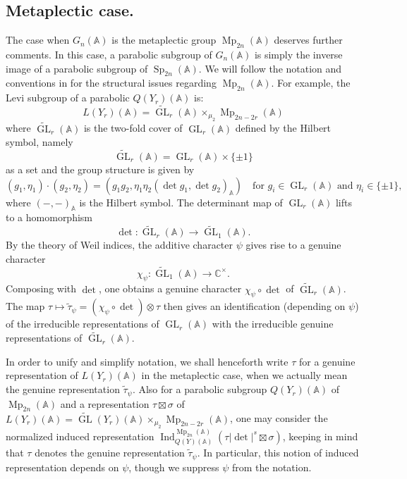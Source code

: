 \documentclass[10pt]{amsart}
\theoremstyle{plain}
\numberwithin{equation}{section}
\begin{document}
\vskip 5pt

  
\subsection{\bf Metaplectic case.} 
 The case when $G_n({\mathbb{A}})$ is the metaplectic group ${\operatorname{Mp}}_{2n}({\mathbb{A}})$ deserves
 further comments. In this case, a parabolic subgroup of $G_n({\mathbb{A}})$ is
 simply the inverse image of a parabolic subgroup of ${\operatorname{Sp}}_{2n}({\mathbb{A}})$. We
 will follow the notation and conventions in \cite{GS} for the  structural
 issues regarding ${\operatorname{Mp}}_{2n}({\mathbb{A}})$. For example, the Levi subgroup of a
 parabolic $Q(Y_r)({\mathbb{A}})$ is:
 \[  L(Y_r)({\mathbb{A}})  = \widetilde{\operatorname{GL}}_r({\mathbb{A}}) \times_{\mu_2} {\operatorname{Mp}}_{2n-2r}({\mathbb{A}}) \]
 where $\widetilde{\operatorname{GL}}_r({\mathbb{A}})$ is the two-fold cover of ${\operatorname{GL}}_r({\mathbb{A}})$
 defined by the Hilbert symbol, namely
 \[ \widetilde{\operatorname{GL}}_r({\mathbb{A}})={\operatorname{GL}}_r({\mathbb{A}})\times\{\pm 1\} \]
  as a set and the
   group structure is given by 
   \[ (g_1,\eta_1)\cdot (g_2, \eta_2)=(g_1g_2,
   \eta_1\eta_2(\det g_1, \det g_2)_{\mathbb{A}}) \quad \text{for $g_i\in{\operatorname{GL}}_r({\mathbb{A}})$ and
   $\eta_i\in\{\pm 1\}$,} \]
    where $(-,-)_{\mathbb{A}}$ is the Hilbert symbol. The
   determinant map of ${\operatorname{GL}}_r({\mathbb{A}})$ lifts to a homomorphism
 \[  \det:  \widetilde{\operatorname{GL}}_r({\mathbb{A}}) \longrightarrow \widetilde{\operatorname{GL}}_1({\mathbb{A}}). \] 
By the theory of Weil indices,  the additive character $\psi$ gives rise to a genuine character 
\[  \chi_{\psi} :  \widetilde{\operatorname{GL}}_1({\mathbb{A}}) \longrightarrow {\mathbb C}^{\times}. \]
 Composing with $\det$, one obtains a genuine character $\chi_{\psi}
 \circ \det$ of $\widetilde{\operatorname{GL}}_r({\mathbb{A}})$. The map $\tau \mapsto
 \tilde{\tau}_{\psi} = (\chi_{\psi} \circ \det) \otimes \tau$ then
 gives an identification (depending on $\psi$) of the irreducible
 representations of ${\operatorname{GL}}_r({\mathbb{A}})$ with the irreducible genuine
 representations of $\widetilde{\operatorname{GL}}_r({\mathbb{A}})$. 
 \vskip 5pt
 
 In order to unify and simplify notation, we shall henceforth write
 $\tau$ for a genuine representation of $L(Y_r)({\mathbb{A}})$ in the metaplectic
 case, when we actually mean the genuine representation
 $\tilde{\tau}_{\psi}$. 
Also for a parabolic subgroup $Q(Y_r)({\mathbb{A}})$ of ${\operatorname{Mp}}_{2n}({\mathbb{A}})$ and a
 representation $\tau \boxtimes \sigma$ of $L(Y_r)({\mathbb{A}})= \widetilde{\operatorname{GL}}(Y_r)({\mathbb{A}})
 \times_{\mu_2} {\operatorname{Mp}}_{2n-2r}({\mathbb{A}})$, one may consider the normalized induced
 representation ${\operatorname{Ind}}_{Q(Y)({\mathbb{A}})}^{{\operatorname{Mp}}_{2n}({\mathbb{A}})} ( \tau|\det|^s \boxtimes \sigma)$, keeping in mind
  that $\tau$ denotes the genuine representation
 $\tilde{\tau}_{\psi}$. In particular, this notion of induced
 representation depends on $\psi$, though we suppress $\psi$ from the notation. 
 \vskip 5pt
 
\end{document}

